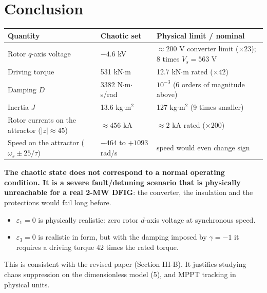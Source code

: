 \documentclass[11pt,a4paper]{article}
\begin{document}
\section{Conclusion}
\begin{center}
\small
\begin{tabular}{p{4.6cm}p{3.0cm}p{7.2cm}}
\toprule
Quantity & Chaotic set & Physical limit / nominal\\
\midrule
Rotor $q$-axis voltage & $-4.6$ kV & $\approx200$ V converter limit ($\times23$); 8 times $V_s=563$ V\\
Driving torque & 531 kN$\cdot$m & 12.7 kN$\cdot$m rated ($\times42$)\\
Damping $D$ & 3382 N$\cdot$m$\cdot$s/rad & $10^{-3}$ (6 orders of magnitude above)\\
Inertia $J$ & 13.6 kg$\cdot$m$^2$ & 127 kg$\cdot$m$^2$ (9 times smaller)\\
Rotor currents on the attractor ($|z|\approx45$) & $\approx456$ kA & $\approx2$ kA rated ($\times200$)\\
Speed on the attractor ($\omega_s\pm25/\tau$) & $-464$ to $+1093$ rad/s & speed would even change sign\\
\bottomrule
\end{tabular}
\end{center}

\textbf{The chaotic state does not correspond to a normal operating condition. It is a severe fault/detuning scenario that is physically unreachable for a real 2-MW DFIG}: the converter, the insulation and the protections would fail long before.
\begin{itemize}
\item $\varepsilon_1=0$ is physically realistic: zero rotor $d$-axis voltage at synchronous speed.
\item $\varepsilon_3=0$ is realistic in form, but with the damping imposed by $\gamma=-1$ it requires a driving torque 42 times the rated torque.
\end{itemize}
This is consistent with the revised paper (Section III-B). It justifies studying chaos suppression on the dimensionless model (5), and MPPT tracking in physical units.
\end{document}
